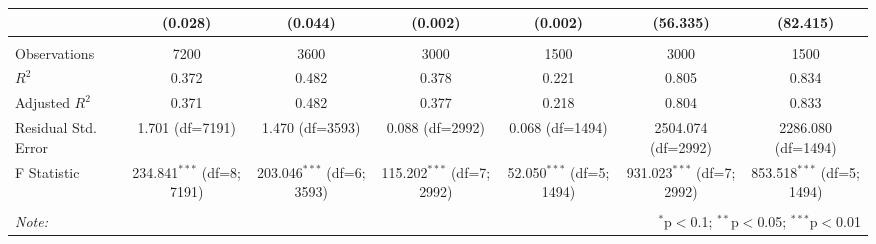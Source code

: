 \begin{table}[!htbp]
\begin{tabular}{@{\extracolsep{5pt}}lcccccc}
& (0.028) & (0.044) & (0.002) & (0.002) & (56.335) & (82.415) \\
\hline \\[-1.8ex]
 Observations & 7200 & 3600 & 3000 & 1500 & 3000 & 1500 \\
 $R^2$ & 0.372 & 0.482 & 0.378 & 0.221 & 0.805 & 0.834 \\
 Adjusted $R^2$ & 0.371 & 0.482 & 0.377 & 0.218 & 0.804 & 0.833 \\
 Residual Std. Error & 1.701 (df=7191) & 1.470 (df=3593) & 0.088 (df=2992) & 0.068 (df=1494) & 2504.074 (df=2992) & 2286.080 (df=1494) \\
 F Statistic & 234.841$^{***}$ (df=8; 7191) & 203.046$^{***}$ (df=6; 3593) & 115.202$^{***}$ (df=7; 2992) & 52.050$^{***}$ (df=5; 1494) & 931.023$^{***}$ (df=7; 2992) & 853.518$^{***}$ (df=5; 1494) \\
\hline
\hline \\[-1.8ex]
\textit{Note:} & \multicolumn{6}{r}{$^{*}$p$<$0.1; $^{**}$p$<$0.05; $^{***}$p$<$0.01} \\
\end{tabular}
\end{table}